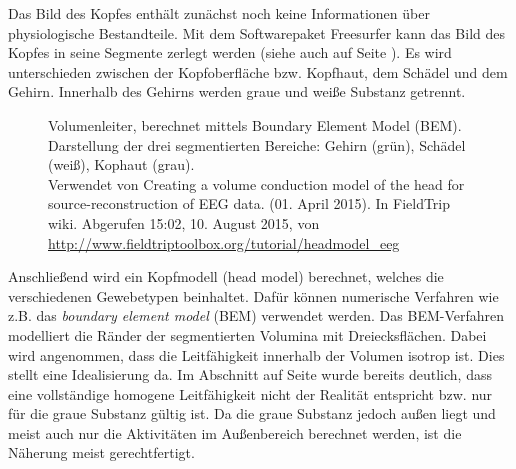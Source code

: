 \documentclass[doc,a4paper,12pt]{apa6}
\makeatletter
\DeclareRobustCommand*{\nameref}[1]{%
      \glqq{\myorg@nameref{#1}}\grqq%
    }%
\makeatother
\begin{document}
Das Bild des Kopfes enthält zunächst noch keine Informationen über physiologische Bestandteile. Mit dem Softwarepaket Freesurfer kann das Bild des Kopfes in seine Segmente zerlegt werden (siehe auch \nameref{sec:head-struct} auf Seite \pageref{sec:head-struct}). Es wird unterschieden zwischen der Kopfoberfläche bzw. Kopfhaut, dem Schädel und dem Gehirn. Innerhalb des Gehirns werden graue und weiße Substanz getrennt.

\begin{figure}[t]
  \centering
  \vspace*{3mm}
  \caption[Volumenleiter, berechnet mittels Boundary Element Model (BEM)]{Volumenleiter, berechnet mittels Boundary Element Model (BEM). Darstellung der drei segmentierten Bereiche: Gehirn (grün), Schädel (weiß), Kophaut (grau).\\ Verwendet von \glqq Creating a volume conduction model of the head for source-reconstruction of EEG data\grqq . (01. April 2015). In FieldTrip wiki. Abgerufen 15:02, 10. August 2015, von \url{http://www.fieldtriptoolbox.org/tutorial/headmodel_eeg}}
  \label{img:bem}
\end{figure}

Anschließend wird ein Kopfmodell (head model) berechnet, welches die verschiedenen Gewebetypen beinhaltet. Dafür können numerische Verfahren wie z.B. das \emph{boundary element model} (BEM) verwendet werden. Das BEM-Verfahren modelliert die Ränder der segmentierten Volumina mit Dreiecksflächen. Dabei wird angenommen, dass die Leitfähigkeit innerhalb der Volumen isotrop ist. Dies stellt eine Idealisierung da. Im Abschnitt \nameref{sec:head-struct} auf Seite \pageref{sec:head-struct} wurde bereits deutlich, dass eine vollständige homogene Leitfähigkeit nicht der Realität entspricht bzw. nur für die graue Substanz gültig ist. Da die graue Substanz jedoch außen liegt und meist auch nur die Aktivitäten im Außenbereich berechnet werden, ist die Näherung meist gerechtfertigt.
\end{document}
